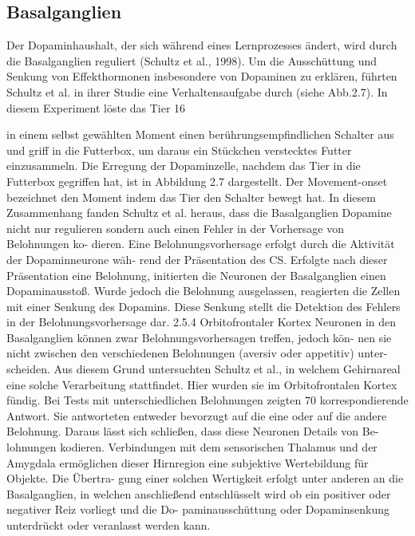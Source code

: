 \subsection{ Basalganglien}
Der Dopaminhaushalt, der sich während eines Lernprozesses ändert, wird durch die
Basalganglien reguliert (Schultz et al., 1998). Um die Ausschüttung und Senkung von
Effekthormonen insbesondere von Dopaminen zu erklären, führten Schultz et al. in ihrer
Studie eine Verhaltensaufgabe durch (siehe Abb.2.7). In diesem Experiment löste das Tier
16

in einem selbst gewählten Moment einen berührungsempfindlichen Schalter aus und griff
in die Futterbox, um daraus ein Stückchen verstecktes Futter einzusammeln. Die Erregung
der Dopaminzelle, nachdem das Tier in die Futterbox gegriffen hat, ist in Abbildung 2.7
dargestellt. Der Movement-onset bezeichnet den Moment indem das Tier den Schalter
bewegt hat.
In diesem Zusammenhang fanden Schultz et al. heraus, dass die Basalganglien Dopamine
nicht nur regulieren sondern auch einen Fehler in der Vorhersage von Belohnungen ko-
dieren. Eine Belohnungsvorhersage erfolgt durch die Aktivität der Dopaminneurone wäh-
rend der Präsentation des CS. Erfolgte nach dieser Präsentation eine Belohnung, initierten
die Neuronen der Basalganglien einen Dopaminausstoß. Wurde jedoch die Belohnung
ausgelassen, reagierten die Zellen mit einer Senkung des Dopamins. Diese Senkung stellt
die Detektion des Fehlers in der Belohnungsvorhersage dar.
2.5.4 Orbitofrontaler Kortex
Neuronen in den Basalganglien können zwar Belohnungsvorhersagen treffen, jedoch kön-
nen sie nicht zwischen den verschiedenen Belohnungen (aversiv oder appetitiv) unter-
scheiden. Aus diesem Grund untersuchten Schultz et al., in welchem Gehirnareal eine
solche Verarbeitung stattfindet. Hier wurden sie im Orbitofrontalen Kortex fündig. Bei
Tests mit unterschiedlichen Belohnungen zeigten 70%
korrespondierende Antwort. Sie antworteten entweder bevorzugt auf die eine oder auf
die andere Belohnung. Daraus lässt sich schließen, dass diese Neuronen Details von Be-
lohnungen kodieren. Verbindungen mit dem sensorischen Thalamus und der Amygdala
ermöglichen dieser Hirnregion eine subjektive Wertebildung für Objekte. Die Übertra-
gung einer solchen Wertigkeit erfolgt unter anderen an die Basalganglien, in welchen
anschließend entschlüsselt wird ob ein positiver oder negativer Reiz vorliegt und die Do-
paminausschüttung oder Dopaminsenkung unterdrückt oder veranlasst werden kann.